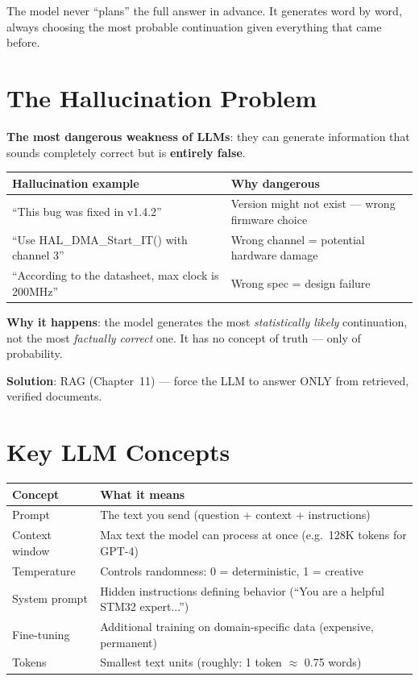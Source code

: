 \documentclass[11pt,a4paper]{report}
\begin{document}
The model never ``plans'' the full answer in advance. It generates word by word, always choosing the most probable continuation given everything that came before.

\section{The Hallucination Problem}

\textbf{The most dangerous weakness of LLMs}: they can generate information that sounds completely correct but is \textbf{entirely false}.

\begin{table}[h]
\centering
\begin{tabularx}{\textwidth}{X X}
\toprule
\textbf{Hallucination example} & \textbf{Why dangerous} \\
\midrule
``This bug was fixed in v1.4.2'' & Version might not exist --- wrong firmware choice \\
``Use HAL\_DMA\_Start\_IT() with channel 3'' & Wrong channel = potential hardware damage \\
``According to the datasheet, max clock is 200MHz'' & Wrong spec = design failure \\
\bottomrule
\end{tabularx}
\end{table}

\textbf{Why it happens}: the model generates the most \textit{statistically likely} continuation, not the most \textit{factually correct} one. It has no concept of truth --- only of probability.

\textbf{Solution}: RAG (Chapter~11) --- force the LLM to answer ONLY from retrieved, verified documents.

\section{Key LLM Concepts}

\begin{table}[h]
\centering
\begin{tabularx}{\textwidth}{l X}
\toprule
\textbf{Concept} & \textbf{What it means} \\
\midrule
Prompt & The text you send (question + context + instructions) \\
Context window & Max text the model can process at once (e.g.\ 128K tokens for GPT-4) \\
Temperature & Controls randomness: 0 = deterministic, 1 = creative \\
System prompt & Hidden instructions defining behavior (``You are a helpful STM32 expert...'') \\
Fine-tuning & Additional training on domain-specific data (expensive, permanent) \\
Tokens & Smallest text units (roughly: 1 token $\approx$ 0.75 words) \\
\bottomrule
\end{tabularx}
\end{table}
\end{document}
